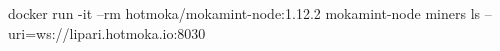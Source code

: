 \begin{shellcommandbox}\begin{ttlst}
docker run -it --rm hotmoka/mokamint-node:1.12.2 mokamint-node miners ls --uri=ws://lipari.hotmoka.io:8030
\end{ttlst}\end{shellcommandbox}
